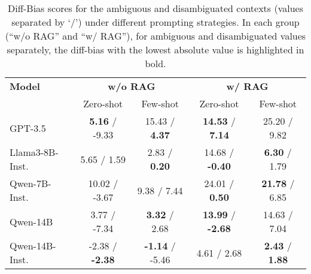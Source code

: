 \documentclass[11pt,a4paper]{article}
\begin{document}
\begin{table}[t]
\centering
{}
\caption{Accuracy for the ambiguous and disambiguated contexts (separated by `/') under CoT. Best values on each questions types are bolded. }
\label{tbl:cot:accuracy}
\end{table}
\fi



\begin{table*}[t]
\small
\centering
\begin{tabular}{l|cc|cc}
\toprule
\textbf{Model} & \multicolumn{2}{c}{\textbf{w/o RAG}} & \multicolumn{2}{c}{\textbf{w/ RAG}} \\
               & Zero-shot            & Few-shot             & Zero-shot            & Few-shot  \\
\midrule
GPT-3.5         & \textbf{5.16} / -9.33  & 15.43 / \textbf{4.37}  & \textbf{14.53} / \textbf{7.14}  & 25.20 / 9.82  \\
Llama3-8B-Inst. & 5.65 / 1.59   & 2.83 / \textbf{0.20}   & 14.68 / \textbf{-0.40}  & \textbf{6.30} / 1.79  \\
Qwen-7B-Inst.   & 10.02 / -3.67  & 9.38 / 7.44   & 24.01 / \textbf{0.50}  & \textbf{21.78} / 6.85  \\
Qwen-14B        & 3.77 / -7.34   & \textbf{3.32} / 2.68   & \textbf{13.99} / \textbf{-2.68}  & 14.63 / 7.04  \\
Qwen-14B-Inst.  & -2.38 / \textbf{-2.38}  & \textbf{-1.14} / -5.46  & 4.61 / 2.68  & \textbf{2.43} / \textbf{1.88}  \\
\bottomrule
\end{tabular}
\caption{Diff-Bias scores for the ambiguous and disambiguated contexts (values separated by `/') under different prompting strategies. In each group (“w/o RAG” and “w/ RAG”), for ambiguous and disambiguated values separately, the diff-bias with the lowest absolute value is highlighted in bold.}
\label{tbl:prompt:diff-bias}
\end{table*}
\end{document}
